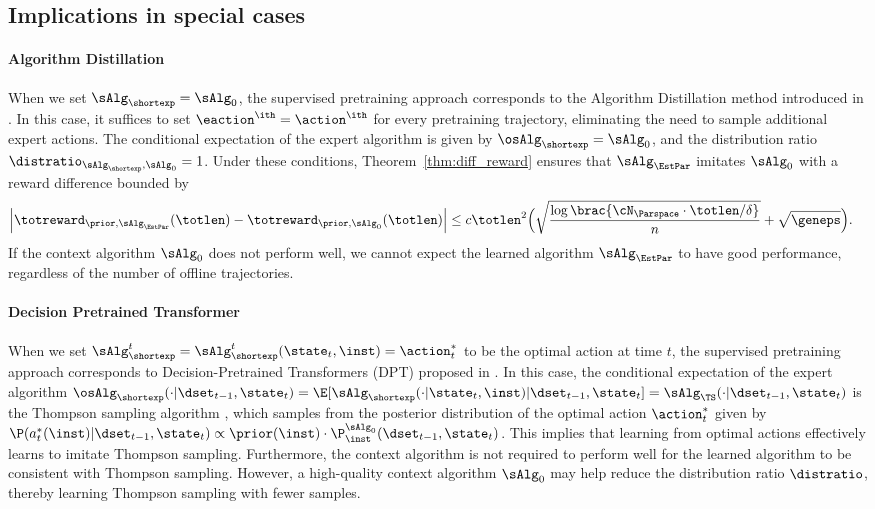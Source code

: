\documentclass[10pt]{article}
\begin{document}
\subsection{Implications in special cases}

\paragraph{Algorithm Distillation} When we set $\sAlg_\shortexp = \sAlg_0$, the supervised pretraining approach corresponds to the Algorithm Distillation method introduced in \cite{laskin2022context}. In this case, it suffices to set $\eaction^\ith = \action^\ith$ for every pretraining trajectory, eliminating the need to sample additional expert actions. The conditional expectation of the expert algorithm is given by $\osAlg_\shortexp = \sAlg_0$, and the distribution ratio $\distratio_{\sAlg_\shortexp,\sAlg_0}=1$. Under these conditions, Theorem~\ref{thm:diff_reward} ensures that $\sAlg_\EstPar$ imitates $\sAlg_0$ with a reward difference bounded by
\begin{align*}
\Big|\totreward_{\prior,\sAlg_\EstPar}(\totlen)-\totreward_{\prior,\sAlg_0}(\totlen)\Big|
&\leq c \totlen^2 \Big( \sqrt{\frac{\log \brac{ \cN_{\Parspace} \cdot \totlen/\delta } }{n} } + \sqrt{\geneps} \Big).
\end{align*}
If the context algorithm $\sAlg_0$ does not perform well, we cannot expect the learned algorithm $\sAlg_\EstPar$ to have good performance, regardless of the number of offline trajectories.


\paragraph{Decision Pretrained Transformer} When we set $\sAlg_\shortexp^t = \sAlg_\shortexp^t(\state_t,\inst)=\action^*_t$ to be the optimal action at time $t$, the supervised pretraining approach corresponds to Decision-Pretrained Transformers (DPT) proposed in \cite{lee2023supervised}. In this case, the conditional expectation of the expert algorithm $\osAlg_\shortexp(\cdot|\dset_{t-1},\state_t)=\E[\sAlg_{\shortexp}(\cdot|\state_t,\inst)|\dset_{t-1},\state_t]=\sAlg_{\TS}(\cdot|\dset_{t-1},\state_t)$ is the Thompson sampling algorithm \citep[Theorem 1]{lee2023supervised}, which samples from the posterior distribution of the optimal action $\action^*_t$ given by $\P(a^*_t(\inst) |\dset_{t-1},\state_t)\propto \prior(\inst)\cdot\P_\inst^{\sAlg_0}(\dset_{t-1},\state_t)$. This implies that learning from optimal actions effectively learns to imitate Thompson sampling. Furthermore, the context algorithm is not required to perform well for the learned algorithm to be consistent with Thompson sampling. However, a high-quality context algorithm $\sAlg_0$ may help reduce the distribution ratio $\distratio$, thereby learning Thompson sampling with fewer samples.
\end{document}

